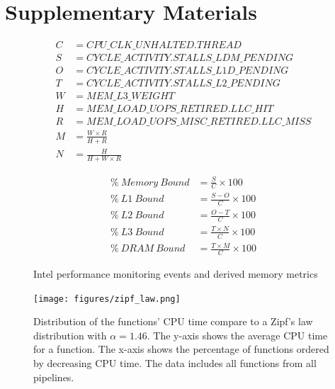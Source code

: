 \documentclass[conference]{IEEEtran}
\begin{document}
\section*{Supplementary Materials}
\begin{figure}[ht]
	\noindent
	\begin{minipage}
		{0.5\textwidth}
		\begin{align*}
			C & = CPU\_CLK\_UNHALTED.THREAD                \\
			S & = CYCLE\_ACTIVITY.STALLS\_LDM\_PENDING     \\
			O & = CYCLE\_ACTIVITY.STALLS\_L1D\_PENDING     \\
			T & = CYCLE\_ACTIVITY.STALLS\_L2\_PENDING      \\
			W & = MEM\_L3\_WEIGHT                          \\
			H & = MEM\_LOAD\_UOPS\_RETIRED.LLC\_HIT        \\
			R & = MEM\_LOAD\_UOPS\_MISC\_RETIRED.LLC\_MISS \\
			M & = \frac{W \times R}{H + R}                 \\
			N & = \frac{H}{H + W \times R}                 
		\end{align*}
	\end{minipage}
	\begin{minipage}
		{0.5\textwidth}
		\begin{align}
			\%~Memory~Bound & = \frac{S}{C} \times 100          \\
			\%~L1~Bound     & = \frac{S - O}{C} \times 100      \\
			\%~L2~Bound     & = \frac{O - T}{C} \times 100      \\
			\%~L3~Bound     & = \frac{T \times N}{C} \times 100 \\
			\%~DRAM~Bound   & = \frac{T \times M}{C} \times 100 
		\end{align}
	\end{minipage}
	\caption{Intel performance monitoring events and derived memory metrics}
	\label{fig:memory-metrics}
\end{figure}

\label{sec:supplementary}

\begin{figure}[ht]
	\centering
	\texttt{[image: figures/zipf\_law.png]}
	\caption{Distribution of the functions' CPU time compare to a Zipf's law distribution with $\alpha=1.46$. The y-axis shows the average CPU time for a function. The x-axis shows the percentage of functions ordered by decreasing CPU time. The data includes all functions from all pipelines.}
	\label{fig:zips-law}
\end{figure}
\end{document}
